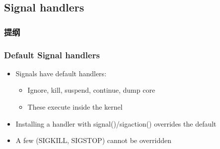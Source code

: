 \subsection{Signal handlers} %
\begin{frame}
\frametitle{提纲} %
\tableofcontents %
\end{frame}
\begin{frame}[fragile]
    \frametitle{Default Signal handlers}
    \begin{itemize}
        \item Signals have default handlers:
        \begin{itemize}
            \item Ignore, kill, suspend, continue, dump core
            \item These execute inside the kernel \pause
        \end{itemize}
        \item Installing a handler with signal()/sigaction() overrides the default
        \item A few (SIGKILL, SIGSTOP) cannot be overridden
    \end{itemize}
\end{frame}
% 
% 
% 
